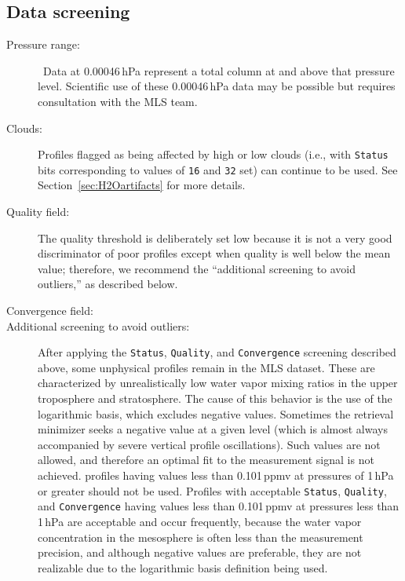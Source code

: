 \begin{nofloatpages}
\subsection{Data screening}
\label{sec:H2OScreening}
\begin{description}
  \item[Pressure range:]  \standardrangestatement\ Data at 0.00046\,hPa represent a total column at and above that pressure level. Scientific use of these 0.00046\,hPa data may be possible but requires consultation with the MLS team.
  \standardprecisionrule
  \evenstatusrule
  \item[Clouds:] Profiles flagged as being affected by high or low clouds (i.e., with \texttt{Status} bits corresponding to values of \texttt{16} and \texttt{32} set) can continue to be used. See Section~\ref{sec:H2Oartifacts} for more details.
  \item[Quality field:]  The quality threshold is deliberately set low because it is not a very good discriminator of poor profiles except when quality is well below the mean value; therefore, we recommend the ``additional screening to avoid outliers,'' as described below.
  \item[Convergence field:] 
  \item[Additional screening to avoid outliers:] After applying the \texttt{Status}, \texttt{Quality}, and \texttt{Convergence} screening described above, some unphysical profiles remain in the MLS \thisv {} dataset. These are characterized by unrealistically low water vapor mixing ratios in the upper troposphere and stratosphere. The cause of this behavior is the use of the logarithmic basis, which excludes negative values. Sometimes the retrieval minimizer seeks a negative value at a given level (which is almost always accompanied by severe vertical profile oscillations). Such values are not allowed, and therefore an optimal fit to the measurement signal is not achieved.  profiles having values less than 0.101\,ppmv at pressures of 1\,hPa or greater should not be used. Profiles with acceptable \texttt{Status}, \texttt{Quality}, and \texttt{Convergence} having values less than 0.101\,ppmv at pressures less than 1\,hPa are acceptable and occur frequently, because the water vapor concentration in the mesosphere is often less than the measurement precision, and although negative values are preferable, they are not realizable due to the logarithmic basis definition being used.

\end{description}
\end{nofloatpages}
